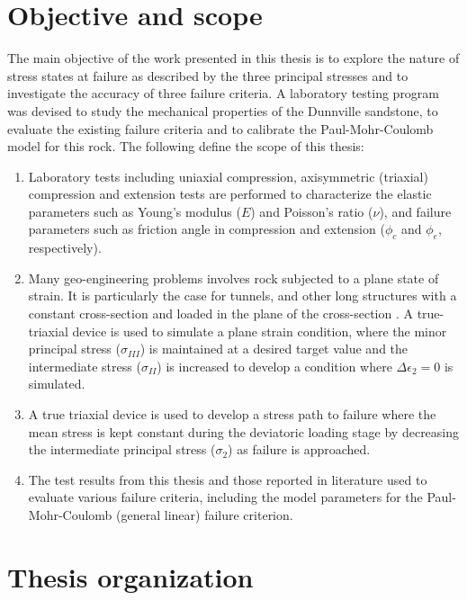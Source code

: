 \section{Objective and scope}

The main objective of the work presented in this thesis is to explore the nature of stress states at failure as described by the three principal stresses and to investigate the accuracy of three failure criteria. A laboratory testing program was devised to study the mechanical properties of the Dunnville sandstone, to evaluate the existing failure criteria and to calibrate the Paul-Mohr-Coulomb model for this rock. The following define the scope of this thesis:

\begin{enumerate}
    \item Laboratory tests including uniaxial compression, axisymmetric (triaxial) compression and extension tests are performed to characterize the elastic parameters such as Young's modulus ($E$) and Poisson’s ratio ($\nu$), and failure parameters such as friction angle in compression and extension ($\phi_c$ and $\phi_e$, respectively).

    \item Many geo-engineering problems involves rock subjected to a plane state of strain. It is particularly the case for tunnels, and other long structures with a constant cross-section and loaded in the plane of the cross-section \cite{Jaeger1979}. A true-triaxial device is used to simulate a plane strain condition, where the minor principal stress ($\sigma_{III}$) is maintained at a desired target value and the intermediate stress ($\sigma_{II}$) is increased to develop a condition where $\Delta\epsilon_2=0$ is simulated.

    \item A true triaxial device is used to develop a stress path to failure where the mean stress is kept constant during the deviatoric loading stage by decreasing the intermediate principal stress ($\sigma_2$) as failure is approached.

    \item The test results from this thesis and those reported in literature used to evaluate various failure criteria, including the model parameters for the Paul-Mohr-Coulomb (general linear) failure criterion.
\end{enumerate}

\section{Thesis organization}

